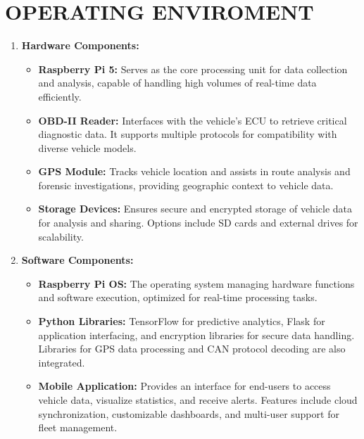 \section{OPERATING ENVIROMENT}
\begin{enumerate}
    \item \textbf{Hardware Components:}
    \begin{itemize}
        \item \textbf{Raspberry Pi 5:} Serves as the core processing unit for data collection and analysis, capable of handling high volumes of real-time data efficiently.
        \item \textbf{OBD-II Reader:} Interfaces with the vehicle’s ECU to retrieve critical diagnostic data. It supports multiple protocols for compatibility with diverse vehicle models.
        \item \textbf{GPS Module:} Tracks vehicle location and assists in route analysis and forensic investigations, providing geographic context to vehicle data.
        \item \textbf{Storage Devices:} Ensures secure and encrypted storage of vehicle data for analysis and sharing. Options include SD cards and external drives for scalability.
    \end{itemize}

    \item \textbf{Software Components:}
    \begin{itemize}
        \item \textbf{Raspberry Pi OS:} The operating system managing hardware functions and software execution, optimized for real-time processing tasks.
        \item \textbf{Python Libraries:} TensorFlow for predictive analytics, Flask for application interfacing, and encryption libraries for secure data handling. Libraries for GPS data processing and CAN protocol decoding are also integrated.
        \item \textbf{Mobile Application: } Provides an interface for end-users to access vehicle data, visualize statistics, and receive alerts. Features include cloud synchronization, customizable dashboards, and multi-user support for fleet management.
    \end{itemize}
\end{enumerate}

